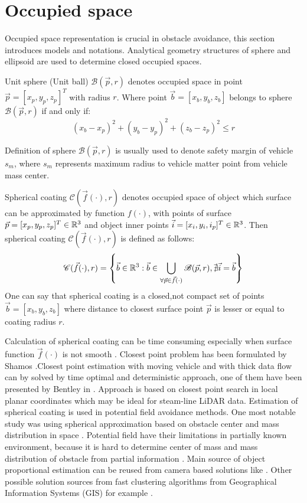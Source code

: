 \section{Occupied space}
\noindent Occupied space representation is crucial in obstacle avoidance, this section introduces models and notations. Analytical geometry structures of sphere and ellipsoid are used to  determine closed occupied spaces.
\begin{definition}{Unit sphere (Unit ball) $\mathscr{B}(\vec{p},r)$} denotes occupied space in point $\vec{p} = [x_p,y_p,z_p]^T$ with radius $r$. Where point $\vec{b} = [x_b,y_b,z_b]$ belongs to sphere $\mathscr{B}(\vec{p},r)$ if and only if:
\begin{equation}
    (x_b-x_p)^2 + (y_b-y_p)^2 + (z_b-z_p)^2 \le r
\end{equation}    
\end{definition}
Definition of sphere $\mathscr{B}(\vec{p},r)$ is usually used to denote safety margin of vehicle $s_m$, where $s_m$ represents maximum radius to vehicle matter point from vehicle mass center. 
\begin{definition}{Spherical coating $\mathscr{C}(\vec{f}(\cdot),r)$} denotes occupied space of object which surface can be approximated by function $f(\cdot)$, with points of surface $\vec{p}=[x_p,y_p,z_p]^T\in\mathbb{R}^3$ and object inner points $\vec{i}=[x_i,y_i,i_p]^T\in \mathbb{R}^3$. Then spherical coating $\mathscr{C}(\vec{f}(\cdot),r)$ is defined as follows:
\begin{equation}
    \mathscr{C}(\vec{f}(\cdot),r) = \left\{\vec{b} \in \mathbb{R}^3: \vec{b}\in \bigcup_{\forall \vec{p} \in \vec{f}(\cdot)} \mathscr{B}(\vec{p},r), \nexists \vec{i}=\vec{b}  \right\}
\end{equation}
One can say that spherical coating is a closed,not compact set of points $\vec{b} = [x_b,y_b,z_b]$  where distance to closest surface point $\vec{p}$ is lesser or equal to coating radius $r$.    
\end{definition}
\noindent Calculation of spherical coating can be time consuming especially when surface function $\vec{f}(\cdot)$ is not smooth \cite{sommerville2016analytical}. Closest point problem has been formulated by Shamos \cite{shamos1975closest}.Closest point estimation with moving vehicle and with thick data flow can by solved by time optimal and deterministic approach, one of them have been presented by Bentley in \cite{bentley1980optimal}. Approach is based on closest point search in local planar coordinates which may be ideal for steam-line LiDAR data. 
Estimation of spherical coating is used in potential field avoidance methods. One most notable study was using spherical approximation based on obstacle center and mass distribution in space \cite{borenstein1991vector}. Potential field have their limitations in partially known environment, because it is hard to determine center of mass and mass distribution of obstacle from partial information \cite{koren1991potential}. Main source of object proportional estimation can be reused from camera based solutions like \cite{oberkampf1993iterative}. Other possible solution sources from fast clustering algorithms from Geographical Information Systems (GIS) for example \cite{zaiane2002clustering}.

